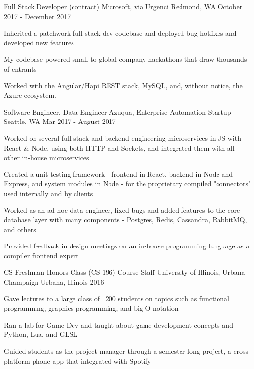 \begin{cventries}
  \cventry
    {Full Stack Developer (contract)}
    {Microsoft, via Urgenci}
    {Redmond, WA}
    {October 2017 - December 2017}
    {
      \begin{cvitems}
        \item {Inherited a patchwork full-stack dev codebase and deployed bug hotfixes and developed new features}
        \item {My codebase powered small to global company hackathons that draw thousands of entrants}        
        \item {Worked with the Angular/Hapi REST stack, MySQL, and, without notice, the Azure ecosystem.}        
      \end{cvitems}
    }  
  \cventry
    {Software Engineer, Data Engineer}
    {Azuqua, Enterprise Automation Startup}
    {Seattle, WA}
    {Mar 2017 - August 2017}
    {
      \begin{cvitems}
        \item {Worked on several full-stack and backend engineering microservices in JS with React \& Node, using both HTTP and Sockets, and integrated them with all other in-house microservices}
        \item {Created a unit-testing framework - frontend in React, backend in Node and Express, and system modules in Node - for the proprietary compiled "connectors" used internally and by clients}        
        \item {Worked as an ad-hoc data engineer, fixed bugs and added features to the core database layer with many components - Postgres, Redis, Cassandra, RabbitMQ, and others}        
        \item {Provided feedback in design meetings on an in-house programming language as a compiler frontend expert}
      \end{cvitems}
    }  
     \cventry
    {CS Freshman Honors Class (CS 196) Course Staff}
    {University of Illinois, Urbana-Champaign}
    {Urbana, Illinois}
    {2016}
    {
      \begin{cvitems}
        \item {Gave lectures to a large class of ~200 students on topics such as functional programming, graphics programming, and big O notation}
        \item {Ran a lab for Game Dev and taught about game development concepts and Python, Lua, and GLSL}
        \item {Guided students as the project manager through a semester long project, a cross-platform phone app that integrated with Spotify}

\end{cvitems}}
\end{cventries}
